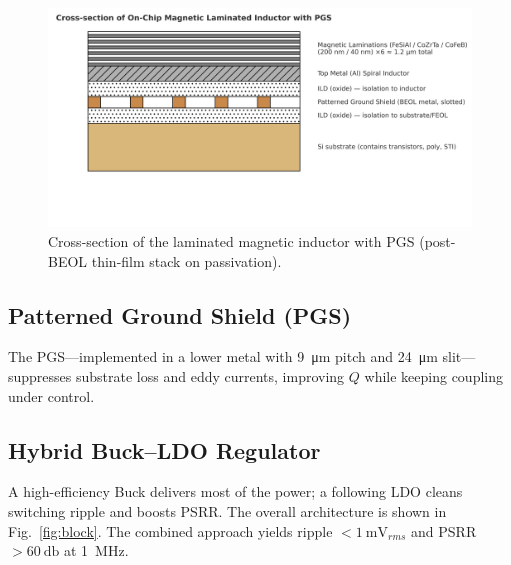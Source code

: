 \documentclass[journal]{IEEEtran}
\begin{document}
\begin{figure}[t]
  \centering
  \includegraphics[width=.85\textwidth]{fig/fig1_laminated_cross_section.png}%
  \vspace{-4pt}
  \caption{Cross-section of the laminated magnetic inductor with PGS (post-BEOL thin-film stack on passivation).}
  \label{fig:cross}
  \vspace{-6pt}
\end{figure}

\subsection{Patterned Ground Shield (PGS)}
The PGS---implemented in a lower metal with \SI{9}{\um} pitch and \SI{24}{\um} slit---suppresses substrate loss and eddy currents, improving $Q$ while keeping coupling under control.

\subsection{Hybrid Buck--LDO Regulator}
A high-efficiency Buck delivers most of the power; a following LDO cleans switching ripple and boosts PSRR. The overall architecture is shown in Fig.~\ref{fig:block}. The combined approach yields ripple $<\SI{1}{\milli\volt_{rms}}$ and PSRR $>\SI{60}{\decibel}$ at \SI{1}{\mega\hertz}.
\end{document}
